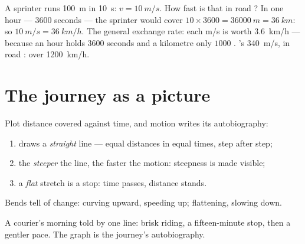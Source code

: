 \begin{example}\label{ex:g7:motion-average-speed:units}
A sprinter runs \qty{100}{m} in \qty{10}{s}: $v = \qty{10}{m/s}$.
How fast is that in road ? In one hour --- $3600$ seconds
--- the sprinter would cover $10 \times 3600 = \qty{36000}{m} =
\qty{36}{km}$: so $\qty{10}{m/s} = \qty{36}{km/h}$. The general
exchange rate: each \unit{m/s} is worth \qty{3.6}{km/h} ---
because an hour holds $3600$ seconds and a kilometre only
$1000$ . 's \qty{340}{m/s}, in road : over
\qty{1200}{km/h}.
\end{example}

\section{The journey as a picture}

\begin{proposition}\label{prop:g7:motion-average-speed:graphs}
Plot distance covered against time, and motion writes its
autobiography:
\begin{enumerate}
  \item {} draws a \emph{straight} line --- equal
        distances in equal times, step after step;
  \item the \emph{steeper} the line, the faster the motion:
        steepness is  made visible;
  \item a \emph{flat} stretch is a stop: time passes, distance
        stands.
\end{enumerate}
Bends tell of change: curving upward, speeding up; flattening,
slowing down.
\end{proposition}

\begin{omfigure}

{\small A courier's morning told by one line: brisk riding, a
fifteen-minute stop, then a gentler pace. The graph is the
journey's autobiography.}
\end{omfigure}

